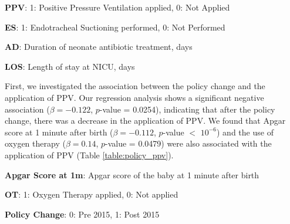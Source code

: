 \documentclass[11pt]{article}
\begin{document}
\begin{table}[h]
\caption{Descriptive statistics before and after the 2015 policy change}
\label{table:desc_stats}
\begin{threeparttable}
\renewcommand{\TPTminimum}{\linewidth}
\begin{tablenotes}
\footnotesize
\item \textbf{PPV}: 1: Positive Pressure Ventilation applied, 0: Not Applied
\item \textbf{ES}: 1: Endotracheal Suctioning performed, 0: Not Performed
\item \textbf{AD}: Duration of neonate antibiotic treatment, days
\item \textbf{LOS}: Length of stay at NICU, days
\end{tablenotes}
\end{threeparttable}
\end{table}


First, we investigated the association between the policy change and the application of PPV. Our regression analysis shows a significant negative association ($\beta = -0.122$, $p$-value = 0.0254), indicating that after the policy change, there was a decrease in the application of PPV. We found that Apgar score at 1 minute after birth ($\beta = -0.112$, $p$-value $<$ $10^{-6}$) and the use of oxygen therapy ($\beta = 0.14$, $p$-value = 0.0479) were also associated with the application of PPV (Table \ref{table:policy_ppv}).

\begin{table}[h]
\caption{Association between policy change and PPV}
\label{table:policy_ppv}
\begin{threeparttable}
\renewcommand{\TPTminimum}{\linewidth}
\begin{tablenotes}
\footnotesize
\item \textbf{Apgar Score at 1m}: Apgar score of the baby at 1 minute after birth
\item \textbf{OT}: 1: Oxygen Therapy applied, 0: Not applied
\item \textbf{Policy Change}: 0: Pre 2015, 1: Post 2015
\end{tablenotes}
\end{threeparttable}
\end{table}
\end{document}
